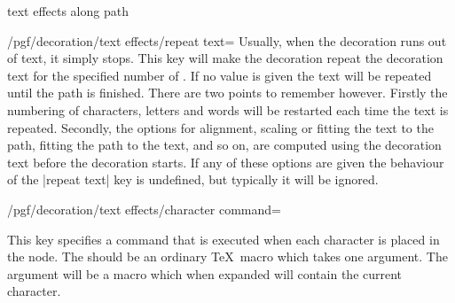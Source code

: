 \begin{decoration}{text effects along path}
\begin{key}{/pgf/decoration/text effects/repeat text=}
  Usually, when the decoration runs out of text, it simply stops.
  This key will make the decoration repeat the decoration text
  for the specified number of . If no value is given
  the text will be repeated until the path is finished. 
  There are two points to remember however.
  Firstly the numbering of characters, letters and words
  will be restarted each time the text is repeated.
  Secondly, the options for alignment, scaling or fitting
  the text to the path, fitting the path to the text, 
  and so on, are computed using the decoration text before the
  decoration starts. If any of these options are given
  the behaviour of the |repeat text| key is undefined, but
  typically it will be ignored.

\begin{codeexample}[]
\end{codeexample}
\end{key}

\begin{key}{/pgf/decoration/text effects/character command=}
  
  This key specifies a command that is executed when
  each character is placed in the node. The  should
  be an ordinary \TeX\ macro which takes one argument. The
  argument will be a macro which when expanded will
  contain the current character.
  
\begin{codeexample}[]
\def\mycommand#1{#1$_\n$}
\end{codeexample}
\end{key}



\end{decoration}
